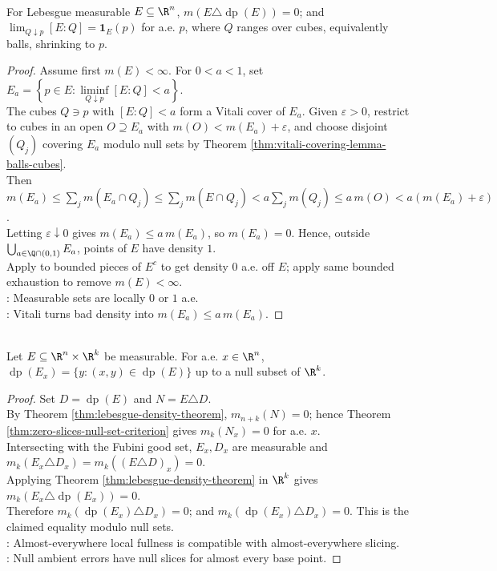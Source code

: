 \begin{theorem} \label{thm:lebesgue-density-theorem} \\
For Lebesgue measurable $E\subseteq\R^n$, $m(E\triangle\operatorname{dp}(E))=0$; and $\lim_{Q\downarrow p}[E:Q]=\mathbf{1}_E(p)$ for a.e. $p$, where $Q$ ranges over cubes, equivalently balls, shrinking to $p$.
\begin{proof}
Assume first $m(E)<\infty$. For $0<a<1$, set $E_a=\left\{p\in E:\liminf\limits_{Q\downarrow p}[E:Q]<a\right\}$.\\
The cubes $Q\ni p$ with $[E:Q]<a$ form a Vitali cover of $E_a$. Given $\varepsilon>0$, restrict to cubes in an open $O\supseteq E_a$ with $m(O)<m(E_a)+\varepsilon$, and choose disjoint $(Q_j)$ covering $E_a$ modulo null sets by Theorem \ref{thm:vitali-covering-lemma-balls-cubes}.\\
Then $m(E_a)\le \sum\limits_jm(E_a\cap Q_j) \le \sum\limits_jm(E\cap Q_j) <a\sum\limits_jm(Q_j) \le a\,m(O) <a(m(E_a)+\varepsilon)$.\\
Letting $\varepsilon\downarrow0$ gives $m(E_a)\le a\,m(E_a)$, so $m(E_a)=0$. Hence, outside $\bigcup_{a\in\Q\cap(0,1)}E_a$, points of $E$ have density $1$.\\
Apply to bounded pieces of $E^c$ to get density $0$ a.e. off $E$; apply same bounded exhaustion to remove $m(E)<\infty$.\\
: Measurable sets are locally $0$ or $1$ a.e.\\
: Vitali turns bad density into $m(E_a)\le a\,m(E_a)$.
\end{proof}
\end{theorem}

\begin{corollary} \label{cor:density-points-commute-with-slices} \\
Let $E\subseteq\R^n\times\R^k$ be measurable. For a.e. $x\in\R^n$, $\operatorname{dp}(E_x)=\{y:(x,y)\in\operatorname{dp}(E)\}$ up to a null subset of $\R^k$.
\begin{proof}
Set $D=\operatorname{dp}(E)$ and $N=E\triangle D$.\\
By Theorem \ref{thm:lebesgue-density-theorem}, $m_{n+k}(N)=0$; hence Theorem \ref{thm:zero-slices-null-set-criterion} gives $m_k(N_x)=0$ for a.e. $x$.\\
Intersecting with the Fubini good set, $E_x,D_x$ are measurable and $m_k(E_x\triangle D_x)=m_k((E\triangle D)_x)=0$.\\
Applying Theorem \ref{thm:lebesgue-density-theorem} in $\R^k$ gives $m_k(E_x\triangle\operatorname{dp}(E_x))=0$.\\
Therefore $m_k(\operatorname{dp}(E_x)\triangle D_x)=0$; and $m_k(\operatorname{dp}(E_x)\triangle D_x)=0$.
This is the claimed equality modulo null sets.\\
: Almost-everywhere local fullness is compatible with almost-everywhere slicing.\\
: Null ambient errors have null slices for almost every base point.
\end{proof}
\end{corollary}


